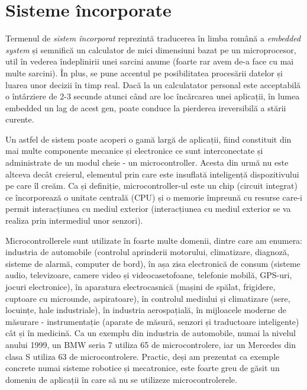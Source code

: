 \chapter{Sisteme încorporate}

Termenul de \textit{sistem încorporat} reprezintă traducerea în limba română a \textit{embedded system} și semnifică un calculator de mici dimensiuni bazat pe un microprocesor, util în vederea îndeplinirii unei sarcini anume (foarte rar avem de-a face cu mai multe sarcini). În plus, se pune accentul pe posibilitatea procesării datelor și luarea unor decizii în timp real. Dacă la un calculatator personal este acceptabilă o întârziere de 2-3 secunde atunci când are loc încărcarea unei aplicații, în lumea embedded un lag de acest gen, poate conduce la pierderea ireversibilă a stării curente.

Un astfel de sistem poate acoperi o gamă largă de aplicații, fiind constituit din mai multe componente mecanice și electronice ce sunt interconectate și administrate de un modul cheie - un microcontroller. Acesta din urmă nu este altceva decât creierul, elementul prin care este insuflată inteligență dispozitivului pe care îl creăm. Ca și definiție, microcontroller-ul este un chip (circuit integrat) ce încorporează o unitate centrală (CPU) și o memorie împreună cu resurse care-i permit interacțiunea cu mediul exterior (interacțiunea cu mediul exterior se va realiza prin intermediul unor senzori).

Microcontrollerele sunt utilizate în foarte multe domenii, dintre care am enumera: industria de automobile (controlul aprinderii motorului, climatizare, diagnoză, sisteme de alarmă, computer de bord), în așa zisa electronică de consum (sisteme audio, televizoare, camere video și videocasetofoane, telefonie mobilă, GPS-uri, jocuri electronice), în aparatura electrocasnică (mașini de spălat, frigidere, cuptoare cu microunde, aspiratoare), în controlul mediului și climatizare (sere, locuințe, hale industriale), în industria aerospațială, în mijloacele moderne de măsurare - instrumentație (aparate de măsură, senzori și traductoare inteligente) cât și în medicină. Ca un exemplu din industria de automobile, numai la nivelul anului 1999, un BMW seria 7 utiliza 65 de microcontrolere, iar un Mercedes din clasa S utiliza 63 de microcontrolere. Practic, deși am prezentat ca exemple concrete numai sisteme robotice și mecatronice, este foarte greu de găsit un domeniu de aplicații în care să nu se utilizeze microcontrolerele.